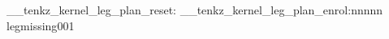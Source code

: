 \documentclass{standalone}
\begin{document}
\ExplSyntaxOn
\__tenkz_kernel_leg_plan_reset:
\__tenkz_kernel_leg_plan_enrol:nnnnn {leg}{missing}{0}{0}{1}
\ExplSyntaxOff
\end{document}
